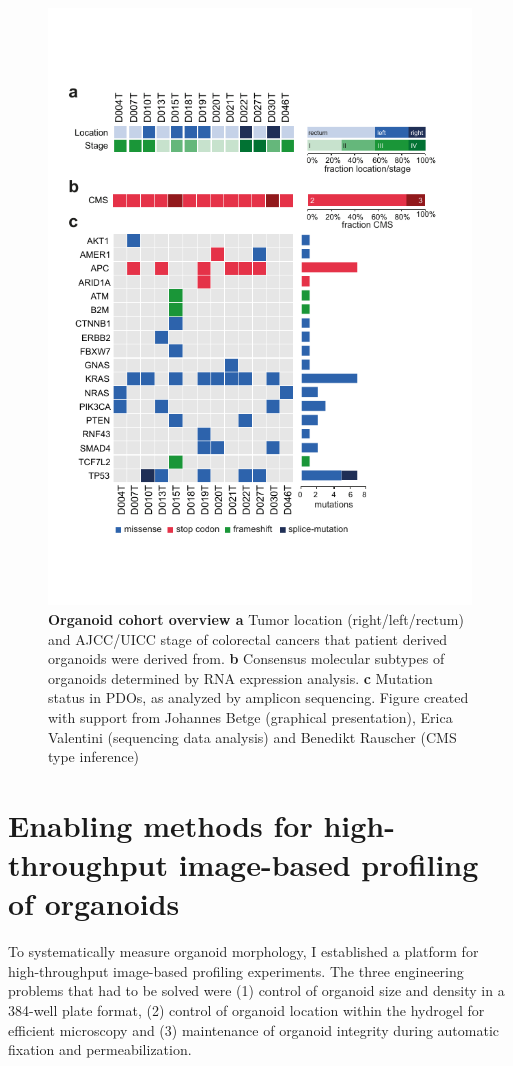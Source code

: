 \begin{flushleft}
\clearpage
\begin{figure}[h]
\centering
\includegraphics[width=\textwidth,
                height=\textheight,
                keepaspectratio]{figures/pdf/fig_120.pdf}
\caption{\textbf{Organoid cohort overview a} Tumor location (right/left/rectum) and AJCC/UICC stage of colorectal cancers that patient derived organoids were derived from. \textbf{b}  Consensus molecular subtypes of organoids determined by RNA expression analysis. \textbf{c} Mutation status in PDOs, as analyzed by amplicon sequencing. Figure created with support from Johannes Betge (graphical presentation),  Erica Valentini (sequencing data analysis) and Benedikt Rauscher (CMS type inference)}
\label{fig_120}
\end{figure}
\clearpage


\section{Enabling methods for high-throughput image-based profiling of organoids}
To systematically measure organoid morphology, I established a platform for high-throughput image-based profiling experiments. The three engineering problems that had to be solved were (1) control of organoid size and density in a 384-well plate format, (2) control of organoid location within the hydrogel for efficient microscopy and (3) maintenance of organoid integrity during automatic fixation and permeabilization. 


\end{flushleft}
